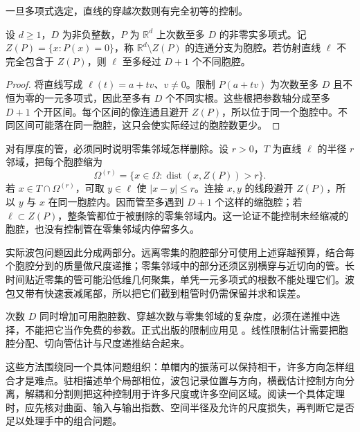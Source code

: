 一旦多项式选定，直线的穿越次数则有完全初等的控制。

\begin{lemma}[直线的胞腔穿越次数]\label{b2:lem:23-polynomial-line-crossing}
设 \(d\geq1\)，\(D\) 为非负整数，\(P\) 为 \(\mathbb R^d\) 上次数至多 \(D\) 的非零实多项式。记 \(Z(P)=\{x:P(x)=0\}\)，称 \(\mathbb R^d\setminus Z(P)\) 的连通分支为胞腔。若仿射直线 \(\ell\) 不完全包含于 \(Z(P)\)，则 \(\ell\) 至多经过 \(D+1\) 个不同胞腔。
\end{lemma}
\begin{proof}
将直线写成 \(\ell(t)=a+tv\)、\(v\neq0\)。限制 \(P(a+tv)\) 为次数至多 \(D\) 且不恒为零的一元多项式，因此至多有 \(D\) 个不同实根。这些根把参数轴分成至多 \(D+1\) 个开区间。每个区间的像连通且避开 \(Z(P)\)，所以位于同一个胞腔中。不同区间可能落在同一胞腔，这只会使实际经过的胞腔数更少。
\end{proof}

对有厚度的管，必须同时说明零集邻域怎样删除。设 \(r>0\)，\(T\) 为直线 \(\ell\) 的半径 \(r\) 邻域，把每个胞腔缩为
\[
 \Omega^{(r)}
 =\{x\in\Omega:\operatorname{dist}(x,Z(P))>r\}.
\]
若 \(x\in T\cap\Omega^{(r)}\)，可取 \(y\in\ell\) 使 \(|x-y|\leq r\)。连接 \(x,y\) 的线段避开 \(Z(P)\)，所以 \(y\) 与 \(x\) 在同一胞腔内。因而管至多遇到 \(D+1\) 个这样的缩胞腔；若 \(\ell\subset Z(P)\)，整条管都位于被删除的零集邻域内。这一论证不能控制未经缩减的胞腔，也没有控制管在零集邻域内停留多久。

\ProseParagraphBreak
实际波包问题因此分成两部分。远离零集的胞腔部分可使用上述穿越预算，结合每个胞腔分到的质量做尺度递推；零集邻域中的部分还须区别横穿与近切向的管。长时间贴近零集的管可能沿低维几何聚集，单凭一元多项式的根数不能处理它们。波包又带有快速衰减尾部，所以把它们截到粗管时仍需保留并求和误差。

次数 \(D\) 同时增加可用胞腔数、穿越次数与零集邻域的复杂度，必须在递推中选择，不能把它当作免费的参数。正式出版的限制应用见 \cite{Guth2016Restriction}。线性限制估计需要把胞腔分配、切向管估计与尺度递推结合起来。

\ProseParagraphBreak
这些方法围绕同一个具体问题组织：单帽内的振荡可以保持相干，许多方向怎样组合才是难点。驻相描述单个局部相位，波包记录位置与方向，横截估计控制方向分离，解耦和分割则把这种控制用于许多尺度或许多空间区域。阅读一个具体定理时，应先核对曲面、输入与输出指数、空间半径及允许的尺度损失，再判断它是否足以处理手中的组合问题。
